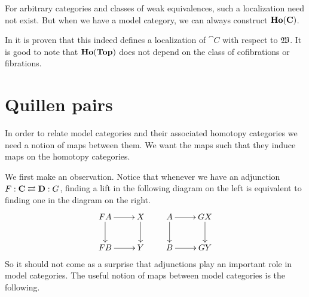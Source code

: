 For arbitrary categories and classes of weak equivalences, such a localization need not exist. But when we have a model category, we can always construct $\mathbf{Ho}(\mathbf{C})$.


In \cite{dwyer} it is proven that this indeed defines a localization of $\cat{C}$ with respect to $\mathfrak{W}$. It is good to note that $\mathbf{Ho}(\mathbf{Top})$ does not depend on the class of cofibrations or fibrations.



\section{Quillen pairs}
In order to relate model categories and their associated homotopy categories we need a notion of maps between them. We want the maps such that they induce maps on the homotopy categories.

We first make an observation. Notice that whenever we have an adjunction $F : \mathbf{C} \rightleftarrows \mathbf{D} : G$, finding a lift in the following diagram on the left is equivalent to finding one in the diagram on the right.
\[\xymatrix{
	FA \ar[r] \ar[d] & X \ar[d] \\
	FB \ar[r] & Y
}\qquad\xymatrix{
	A \ar[r] \ar[d] & GX \ar[d] \\
	B \ar[r] & GY
}\]
So it should not come as a surprise that adjunctions play an important role in model categories. The useful notion of maps between model categories is the following.

